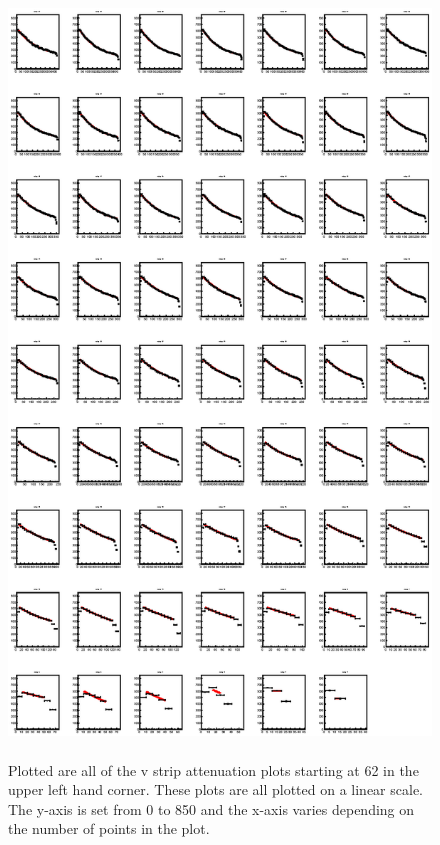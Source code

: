 \FloatBarrier
\begin{figure}[h]
    \centering
    \includegraphics[width= 6.5in, height = 8in, keepaspectratio = true]{allvstrips}
    \caption{Plotted are all of the v strip attenuation plots starting at 62 in the upper left hand 
    corner. These plots are all plotted on a linear scale. The y-axis is set from 0 to 850 and the 
    x-axis varies depending on the number of points in the plot.}
    \label{fig:allvstrips}
\end{figure}


\FloatBarrier

